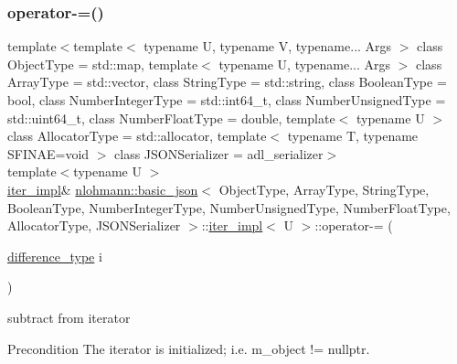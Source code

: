 \subsubsection{\texorpdfstring{operator-\/=()}{operator-=()}}
{\footnotesize\ttfamily template$<$template$<$ typename U, typename V, typename... Args $>$ class Object\+Type = std\+::map, template$<$ typename U, typename... Args $>$ class Array\+Type = std\+::vector, class String\+Type  = std\+::string, class Boolean\+Type  = bool, class Number\+Integer\+Type  = std\+::int64\+\_\+t, class Number\+Unsigned\+Type  = std\+::uint64\+\_\+t, class Number\+Float\+Type  = double, template$<$ typename U $>$ class Allocator\+Type = std\+::allocator, template$<$ typename T, typename S\+F\+I\+N\+A\+E=void $>$ class J\+S\+O\+N\+Serializer = adl\+\_\+serializer$>$ \\
template$<$typename U $>$ \\
\hyperlink{classnlohmann_1_1basic__json_1_1iter__impl}{iter\+\_\+impl}\& \hyperlink{classnlohmann_1_1basic__json}{nlohmann\+::basic\+\_\+json}$<$ Object\+Type, Array\+Type, String\+Type, Boolean\+Type, Number\+Integer\+Type, Number\+Unsigned\+Type, Number\+Float\+Type, Allocator\+Type, J\+S\+O\+N\+Serializer $>$\+::\hyperlink{classnlohmann_1_1basic__json_1_1iter__impl}{iter\+\_\+impl}$<$ U $>$\+::operator-\/= (\begin{DoxyParamCaption}\item[{\hyperlink{classnlohmann_1_1basic__json_1_1iter__impl_aa3d908ee643e5938d32e5f6d261d7715}{difference\+\_\+type}}]{i }\end{DoxyParamCaption})\hspace{0.3cm}{\ttfamily [inline]}}



subtract from iterator 

\begin{DoxyPrecond}{Precondition}
The iterator is initialized; i.\+e. {\ttfamily m\+\_\+object != nullptr}. 
\end{DoxyPrecond}
\mbox{\label{classnlohmann_1_1basic__json_1_1iter__impl_afd0d209ef3a07a8aa3ee46e03538ffa6}} 
